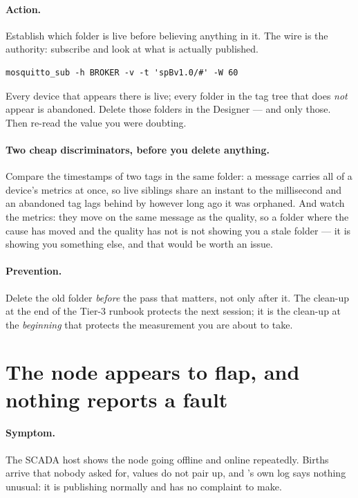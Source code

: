 \paragraph{Action.} Establish which folder is live before believing anything in it. The wire is the
authority: subscribe and look at what is actually published.
\begin{verbatim}
mosquitto_sub -h BROKER -v -t 'spBv1.0/#' -W 60
\end{verbatim}
Every device that appears there is live; every folder in the tag tree that does \emph{not} appear is
abandoned. Delete those folders in the Designer --- and only those. Then re-read the value you were
doubting.

\paragraph{Two cheap discriminators, before you delete anything.} Compare the timestamps of two tags
in the same folder: a message carries all of a device's metrics at once, so live siblings share an
instant to the millisecond and an abandoned tag lags behind by however long ago it was orphaned. And
watch the  metrics: they move on the same message as the quality, so a folder where
the cause has moved and the quality has not is not showing you a stale folder --- it is showing you
something else, and that would be worth an issue.

\paragraph{Prevention.} Delete the old folder \emph{before} the pass that matters, not only after
it. The clean-up at the end of the Tier-3 runbook protects the next session; it is the clean-up at
the \emph{beginning} that protects the measurement you are about to take.

\section{The node appears to flap, and nothing reports a fault}
\label{sec:trouble-descriptor-collision}

\paragraph{Symptom.} The SCADA host shows the node going offline and online repeatedly. Births
arrive that nobody asked for,  values do not pair up, and \prog's own log says nothing
unusual: it is publishing normally and has no complaint to make.

